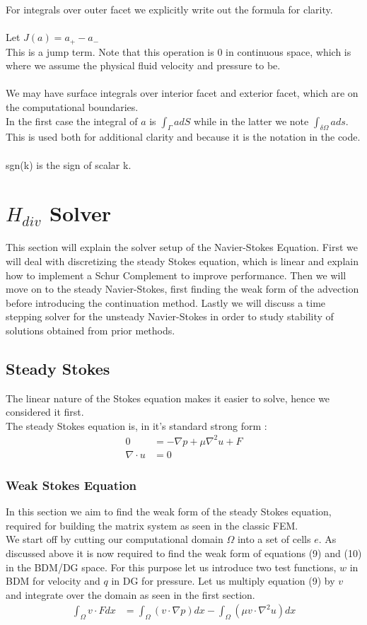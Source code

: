 \documentclass[11pt,twoside,a4paper]{article}
\begin{document}
For integrals over outer facet we explicitly write out the formula for clarity.\\
\\
Let $J(a) = a_+ - a_-$\\
This is a jump term. Note that this operation is $0$ in continuous space, which is where we assume the physical fluid velocity and pressure to be.\\
\\
We may have surface integrals over interior facet and exterior facet, which are on the computational boundaries.\\
In the first case the integral of $a$ is $\int_\Gamma a dS$ while in the latter we note $\int_{\delta \Omega} a ds$.\\
This is used both for additional clarity and because it is the notation in the code.\\
\\
sgn(k) is the sign of scalar k.

\section{$H_{div}$ Solver}
This section will explain the solver setup of the Navier-Stokes Equation. First we will deal with discretizing the steady Stokes equation, which is linear and explain how to implement a Schur Complement to improve performance. Then we will move on to the steady Navier-Stokes, first finding the weak form of the advection before introducing the continuation method. Lastly we will discuss a time stepping solver for the unsteady Navier-Stokes in order to study stability of solutions obtained from prior methods.
\subsection{Steady Stokes}
The linear nature of the Stokes equation makes it easier to solve, hence we considered it first.\\
The steady Stokes equation is, in it's standard strong form :
\begin{align}
0 &= -\nabla p + \mu \nabla^2 u + F  \\
\nabla \cdot u &= 0
\end{align}

\subsubsection{Weak Stokes Equation}
In this section we aim to find the weak form of the steady Stokes equation, required for building the matrix system as seen in the classic FEM.\\
We start off by cutting our computational domain $\Omega$ into a set of cells $e$. As discussed above it is now required to find the weak form of equations (9) and (10) in the BDM/DG space.
For this purpose let us introduce two test functions, $w$ in BDM for velocity and $q$ in DG for pressure.
Let us multiply equation (9) by $v$ and integrate over the domain as seen in the first section.
\begin{align*}
\int_\Omega v \cdot F dx &= \int_\Omega (v \cdot \nabla p) dx - \int_\Omega (\mu v \cdot \nabla^2 u) dx
\end{align*}
\end{document}
